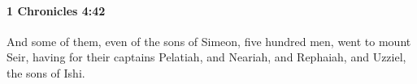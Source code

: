 
		\paragraph{1 Chronicles 4:42} %
			\label{1CHRONICLES-4-42}

			And some of them, even of the sons of Simeon, five hundred men, went to mount Seir, having for their captains Pelatiah, and Neariah, and Rephaiah, and Uzziel, the sons of Ishi.


